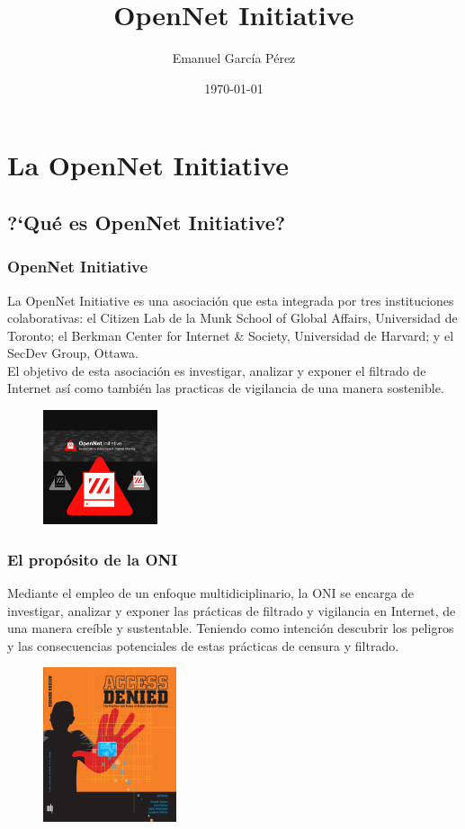 \documentclass{beamer}
\title{\textbf{OpenNet Initiative}}
\author{Emanuel Garc\'ia P\'erez}
\date{\today}
\begin{document}
\frame[allowframebreaks]{\titlepage}
\section[Contenidos]{}
\frame{
\transdissolve[duration=0.2]
\tableofcontents
}


\section{La OpenNet Initiative}
\subsection{?`Qu\'e es OpenNet Initiative?}
\frame
{
\transdissolve[duration=0.2]
\frametitle{OpenNet Initiative}
La OpenNet Initiative es una asociaci\'on que esta integrada por tres instituciones colaborativas: el Citizen Lab de la Munk School of Global Affairs, Universidad de Toronto; el Berkman Center for Internet \& Society, Universidad de Harvard; y el SecDev Group, Ottawa.\\
El objetivo de esta asociaci\'on es investigar, analizar y exponer el filtrado de Internet as\'i como tambi\'en las practicas de vigilancia de una manera sostenible.
\begin{figure}
  \centering
    \includegraphics[width=0.3\textwidth]{oni.png}
  \label{fig:ejemplo}
\end{figure}
}

\frame
{
\transdissolve[duration=0.2]
\frametitle{El prop\'osito de la ONI}
Mediante el empleo de un enfoque multidiciplinario, la ONI se encarga de investigar, analizar y exponer las pr\'acticas de filtrado y vigilancia en Internet, de una manera cre\'ible y sustentable. Teniendo como intenci\'on descubrir los peligros y las consecuencias potenciales de estas pr\'acticas de censura y filtrado.
\begin{figure}
  \centering
    \includegraphics[width=0.35\textwidth]{img.jpg}
  \label{fig:ejemplo}
\end{figure}
}
\end{document}
